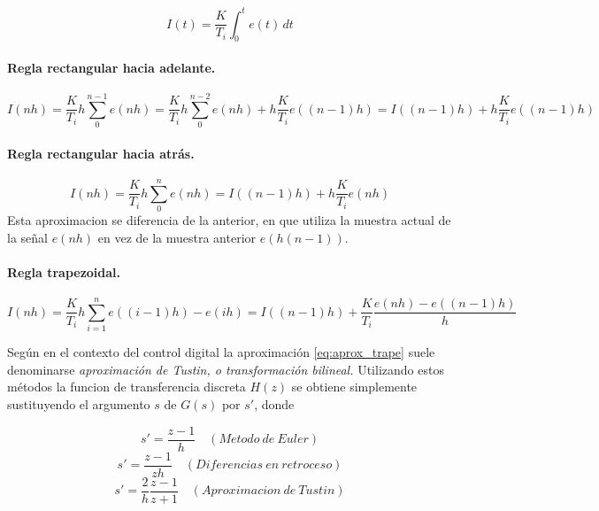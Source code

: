 \documentclass[10pt,conference,a4paper,onecolumn]{article}%
\begin{document}
\begin{equation}
I(t)=\frac{K}{T_i}\int_0^t e(t) \,dt
\label{eq:int_var}
\end{equation}  
  
  \paragraph{Regla rectangular hacia adelante.} 
  
  \begin{equation}
  I(nh)=\frac{K}{T_i}h \sum_0^{n-1}e(nh)= \frac{K}{T_i}h \sum_0^{n-2}e(nh) + h\frac{K}{T_i} e((n-1)h)=I((n-1)h)+  h\frac{K}{T_i} e((n-1)h)
  \end{equation}
  
  \paragraph{Regla rectangular hacia atrás.} 
  \begin{equation}
  I(nh)=\frac{K}{T_i}h \sum_0^{n}e(nh)=I((n-1)h)+  h\frac{K}{T_i} e(nh)
  \end{equation}
  Esta aproximacion se diferencia de la anterior, en que utiliza la muestra actual de la señal $e(nh)$ en vez de la muestra anterior $e(h(n-1))$.
  
  \paragraph{Regla trapezoidal.} 
  
  \begin{equation}
  I(nh)=\frac{K}{T_i}h \sum_{i=1}^{n}e((i-1)h)-e(ih)=I((n-1)h)+  \frac{K}{T_i} \frac{e(nh) -e((n-1)h)}{h}
  \label{eq:aprox_trape} 
  \end{equation}
  
  Según \cite{astrom} en el contexto del control digital la aproximación \ref{eq:aprox_trape} suele denominarse \textit{aproximación de Tustin, o transformación bilineal.} Utilizando estos métodos la funcion de transferencia discreta $H(z)$ se obtiene simplemente sustituyendo el argumento $s$ de $G(s)$ por $s'$, donde
  
  \begin{equation}
  s'=\frac{z-1}{h} \quad (Metodo\ de\ Euler)
\end{equation}   
  \begin{equation}
  s'=\frac{z-1}{zh} \quad (Diferencias\ en\ retroceso)
\end{equation}   
\begin{equation}
  s'=\frac{2}{h} \frac{z-1}{z+1} \quad (Aproximacion\ de\ Tustin)
\end{equation}  
\end{document}
